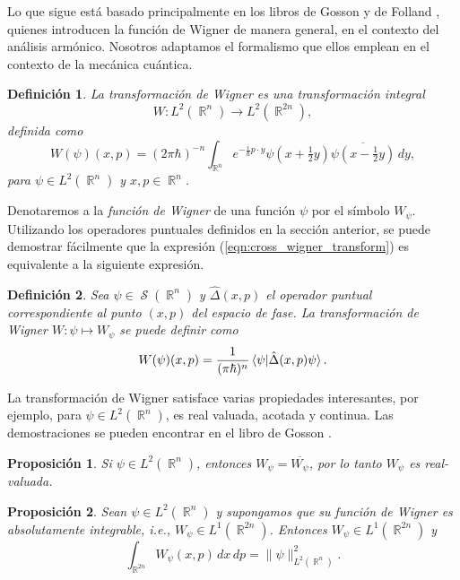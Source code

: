 \documentclass[a4paper]{report}
\DeclareMathOperator{\R}{\mathbb{R}}
\DeclareMathOperator{\Sz}{\mathcal S}
\newtheorem{definition}{Definición}
\newtheorem{proposition}{Proposición}
\begin{document}
  Lo que sigue está basado principalmente en los libros de
  Gosson \cite{gosson2017} y de Folland \cite{folland1989},
  quienes introducen la función de Wigner de manera general,
  en el contexto del análisis armónico. Nosotros adaptamos
  el formalismo que ellos emplean en el contexto de la
  mecánica cuántica.
  \begin{definition}
    La transformación de Wigner es una transformación
    integral
    \begin{equation}
      W : L^2(\R^{n}) \to L^2(\R^{2n}),
    \end{equation}
    definida como
    \begin{equation}
      \label{eqn:cross_wigner_transform}
      W(\psi)(x,p)
      = (2\pi\hbar)^{-n} \int_{\R^{n}} e^{-\frac{i}{\hbar} p
      \cdot y} \psi(x + \tfrac{1}{2}y) \overline{\psi(x -
      \tfrac{1}{2}y)} \, dy,
    \end{equation}
    para $\psi \in L^2(\R^{n})$ y $x,p \in \R^{n}$.  
  \end{definition} 
  Denotaremos a la \textit{función de Wigner} de una función
  $\psi$ por el símbolo $W_\psi$. Utilizando los operadores
  puntuales definidos en la sección anterior, se puede
  demostrar fácilmente que la expresión
  (\ref{eqn:cross_wigner_transform}) es equivalente a la
  siguiente expresión.
  \begin{definition}
    Sea $\psi \in \Sz(\R^{n})$ y $\hat\Delta(x,p)$ el
    operador puntual correspondiente al punto $(x,p)$ del
    espacio de fase. La transformación de Wigner $W : \psi
    \mapsto W_\psi$ se puede definir como
    \begin{equation}
      \label{eqn:def_wigner}
      W(\psi)(x,p)
      = \frac{1}{(\pi\hbar)^{n}} \braket{\psi|
      \hat{\Delta}(x,p)\psi}.
    \end{equation}
  \end{definition}
  La transformación de Wigner satisface varias propiedades
  interesantes, por ejemplo, para $\psi \in L^2(\R^{n})$, es
  real valuada, acotada y continua. Las demostraciones se
  pueden encontrar en el libro de Gosson \cite{degosson2016}.
  \begin{proposition}
    Si $\psi \in L^2(\R^{n})$, entonces $W_\psi =
    \overline{W_\psi}$, por lo tanto $W_\psi$ es
    real-valuada. 
  \end{proposition}
  \begin{proposition}
    Sean $\psi \in L^2(\R^{n})$ y supongamos que su función
    de Wigner es absolutamente integrable, i.e., $W_\psi \in
    L^{1}(\R^{2n})$. Entonces $W_\psi \in L^{1}(\R^{2n})$ y
    \begin{equation}
      \int_{\R^{2n}} W_\psi(x,p) \, dx \, dp 
      = \|\psi\|^2_{L^2(\R^{n})}.
    \end{equation}
  \end{proposition}
\end{document}
